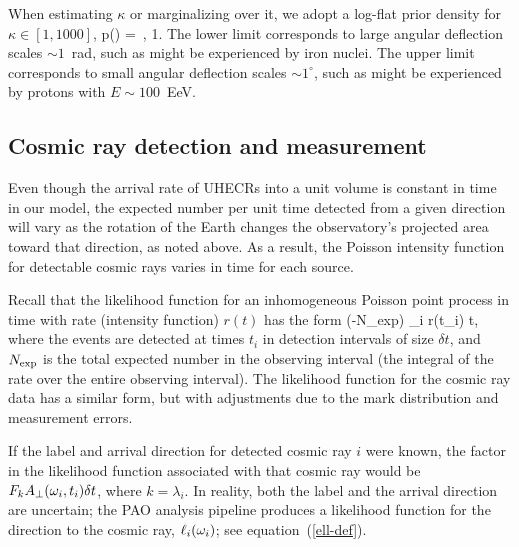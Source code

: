 When estimating $\kappa$ or marginalizing over it, we adopt a log-flat prior
density for $\kappa\in[1,1000]$,
\be
p(\kappa) = \,,  1\leq\kappa{}.
\label{k-prior}
\ee
The lower limit corresponds to large angular deflection scales $\sim 1$~rad,
such as might be experienced by iron nuclei.  The upper limit corresponds
to small angular deflection scales $\sim 1^\circ$, such as might be
experienced by protons with $E\sim 100$~EeV.


\subsection{Cosmic ray detection and measurement}
\label{sec:dtxn}

Even though the arrival rate of UHECRs into a unit volume is constant in
time in our model, the expected number per unit time detected from a given
direction will vary as the rotation of the Earth changes the observatory's
projected area toward that direction, as noted above.  As a result, the
Poisson intensity function for detectable cosmic rays varies in
time for each source.

Recall that the likelihood function for an inhomogeneous Poisson
point process in time with rate (intensity function) $r(t)$ has the form
\be
\exp(-N_{\rm exp}) \prod_i r(t_i) \delta t,
\label{simple-ppp-like}
\ee
where the events are detected at times $t_i$ in detection intervals of size
$\delta t$, and $N_{\rm exp}$ is the total expected number in the observing
interval (the integral of the rate over the entire observing interval).
The likelihood function for the cosmic ray data has a similar form, but
with adjustments due to the mark distribution and measurement errors.

If the label and arrival direction for detected cosmic ray $i$ were known, the
factor in the likelihood function associated with that cosmic ray would be
$F_k A_\perp(\omega_i, t_i) \delta t$, where $k=\lambda_i$.
In reality, both the label and the arrival direction are uncertain; the PAO
analysis pipeline produces a likelihood function for the direction to the
cosmic ray, $\ell_i(\omega_i)$; see equation~(\ref{ell-def}).

